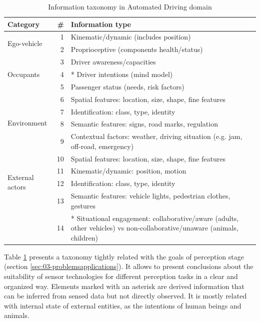 \documentclass[journal]{IEEEtran}
\begin{document}
\renewcommand{\arraystretch}{1.1}
\begin{table}[b] %
	\caption{Information taxonomy in Automated Driving domain}
	\label{tab:info-taxonomy}
	\begin{tabular*}{\linewidth}{lrp{5.8cm}} %
		\hline %
		\textbf{Category} & \textbf{\#}	& \textbf{Information type}	\\
		\hline %
		\multirow{2}{*}{Ego-vehicle}
		& 1 & Kinematic/dynamic (includes position) \\
		& 2 & Proprioceptive (components health/status) \\
		\hline %
		\multirow{3}{*}{Occupants}
		& 3 & Driver awareness/capacities \\
		& 4 & * Driver intentions (mind model)  \\
		& 5 & Passenger status (needs, risk factors) \\
		\hline %
		\multirow{4}{*}{Environment}
		& 6 & Spatial features: location, size, shape, fine features 
		\\
		& 7 & Identification: class, type, identity \\
		& 8 & Semantic features: signs, road marks, regulation \\
		& 9 & Contextual factors: weather, driving situation (e.g. jam, 
		off-road, emergency) \\
		\hline %
		\multirow{4}{*}{External actors}
		& 10 & Spatial features: location, size, shape, fine features  \\
		& 11 & Kinematic/dynamic: position, motion \\
		& 12 & Identification: class, type, identity \\ 
		& 13 & Semantic features: vehicle lights, pedestrian clothes, gestures 
		\\
		& 14 & * Situational engagement: collaborative/aware 
		(adults, other vehicles) vs non-collaborative/unaware 
		(animals, children) \\ 
		\hline %
	\end{tabular*}
\end{table}

Table \ref{tab:info-taxonomy} presents a taxonomy tightly related with 
the goals of perception stage (section \ref{sec:03-problemsapplications}). 
It allows to present conclusions about the suitability of sensor technologies 
for different perception tasks in a clear and organized way.
Elements marked with an asterisk are derived information that can 
be inferred from sensed data but not directly observed. It is mostly related 
with internal state of external entities, as the intentions of human beings and 
animals.
\end{document}
